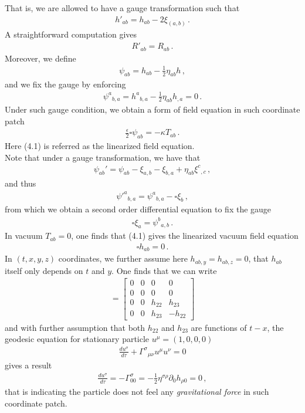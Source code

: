 \documentclass[11pt, onesided]{book}
\theoremstyle{break}
\theoremstyle{break}
\newcommand{\pd}{\partial}
\newcommand{\bmat}[1]{\begin{bmatrix} #1 \end{bmatrix}}
\begin{document}
That is, we are allowed to have a gauge transformation such that
\begin{align*}
h'_{ab} = h_{ab} - 2\xi_{(a,b)}\,.
\end{align*}
A straightforward computation gives
\begin{align*}
R'_{ab} = R_{ab}\,.
\end{align*}
Moreover, we define
\begin{align*}
\psi_{ab} = h_{ab} - \frac{1}{2}\eta_{ab}h\,,
\end{align*}
and we fix the gauge by enforcing
\begin{align*}
\psi^a{}_{b,a}=h^a{}_{b,a} - \frac{1}{2}\eta_{ab}h_{,a} = 0\,.
\end{align*}
Under such gauge condition, we obtain a form of field equation in such coordinate patch
\begin{align}
\frac{\epsilon}{2}\square \psi_{ab} = -\kappa T_{ab}\,.
\end{align}
Here (4.1) is referred as the linearized field equation.\\

Note that under a gauge transformation, we have that
\begin{align*}
\psi_{ab}' = \psi_{ab} - \xi_{a,b} - \xi_{b,a} + \eta_{ab}\xi^c{}_{,c}\,,
\end{align*}
and thus 
\begin{align*}
{\psi'}^{a}{}_{b,a} = \psi^a{}_{b,a} - \square \xi_b\,,
\end{align*}
from which we obtain a second order differential equation to fix the gauge
\begin{align}
\square \xi_a = \psi^b{}_{a,b}\,.
\end{align}
In vacuum $T_{ab} = 0$, one finds that (4.1) gives the linearized vacuum field equation
\begin{align*}
\square h_{ab} = 0\,.
\end{align*}
In $(t,x,y,z)$ coordinates, we further assume here $h_{ab,y} = h_{ab,z} = 0$, that $h_{ab}$ itself only depends on $t$ and $y$. One finds that we can write
\begin{align*}
[h_{ab}] = \bmat{0 & 0 & 0 & 0\\
0 & 0 & 0 & 0\\
0 & 0 & h_{22} & h_{23}\\
0 & 0 & h_{23} & -h_{22}}
\end{align*}
and with further assumption that both $h_{22}$ and $h_{23}$ are functions of $t-x$, the geodesic equation for stationary particle $u^\mu = (1,0,0,0)$
\begin{align*}
\frac{d u^\sigma}{d\tau} + \Gamma^{\sigma}{}_{\mu\nu}u^\mu u^\nu = 0
\end{align*}
gives a result
\begin{align*}
\frac{du^\sigma}{d\tau} = -\Gamma_{00}^\sigma =-\frac{1}{2}\eta^{\sigma\rho}\pd_0h_{\rho 0} = 0\,,
\end{align*}
that is indicating the particle does not feel any \textit{gravitational force} in such coordinate patch.\\
\end{document}
